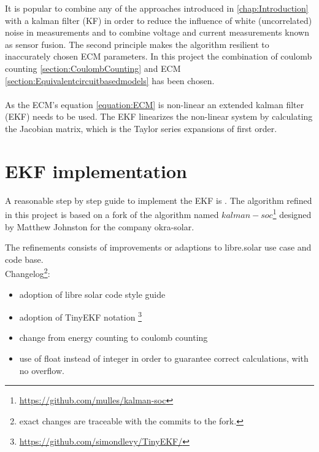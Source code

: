 It is popular to combine %
any of the approaches introduced in \ref{chap:Introduction} with a kalman filter (KF) in order to reduce the influence of white (uncorrelated) noise in measurements and to combine voltage and current measurements known as sensor fusion. The second principle makes the algorithm resilient to inaccurately chosen ECM parameters. In this project the combination of coulomb counting \ref{section:CoulombCounting} and ECM \ref{section:Equivalentcircuitbasedmodels} has been chosen. \\ %
\\
As the  ECM's equation \ref{equation:ECM}  is non-linear an extended kalman filter (EKF) needs to be used. The EKF linearizes the non-linear system by calculating the Jacobian matrix, which is the Taylor series expansions of first order.  %
\\

\section{EKF implementation}
\label{Fork}

A reasonable step by step guide to implement the EKF is \cite{rzepka2021implementing}. The algorithm refined in this project is based on a fork of the algorithm named $kalman-soc$\footnote{ \url{https://github.com/mulles/kalman-soc}} designed by Matthew Johnston for the company okra-solar. 

The refinements consists of improvements or adaptions to libre.solar use case and code base.
\\

Changelog\footnote{exact changes are traceable with the commits to the fork. 
}: 

\begin{itemize}
\item adoption of libre solar code style guide 

\item adoption of TinyEKF notation  \footnote{\url{https://github.com/simondlevy/TinyEKF/}} 
\item change from energy counting to coulomb counting

\item use of float instead of integer in order to guarantee correct calculations, with no overflow. 

\end{itemize}


